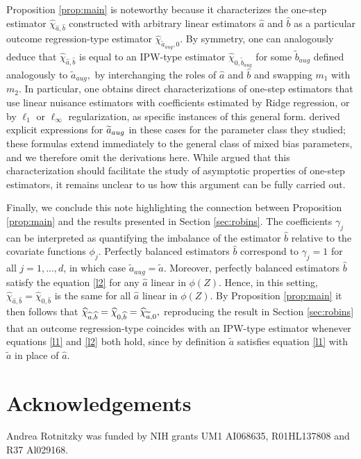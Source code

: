 \documentclass{article}
\begin{document}
Proposition \ref{prop:main} is noteworthy because it characterizes the one-step
estimator $\widehat{\chi }_{\widehat{a},\widehat{b}}$ constructed with
arbitrary linear estimators $\widehat{a}$ and $\widehat{b}$ as a particular
outcome regression-type estimator $\widehat{\chi }_{\widetilde{a}_{aug},0}$.
By symmetry, one can analogously deduce that $\widehat{\chi }_{\widehat{a},%
\widehat{b}}$ is equal to an IPW-type estimator $\widehat{\chi }_{0,%
\widetilde{b}_{aug}}$ for some $\widetilde{b}_{aug}$ defined analogously to $%
\widetilde{a}_{aug},$ by interchanging the roles of $\widehat{a}$ and $%
\widehat{b}$ and swapping $m_{1}$ with $m_{2}.$ In particular, one obtains
direct characterizations of one-step estimators that use linear nuisance
estimators  with coefficients estimated by Ridge regression, or by $\ell _{1}
$ or $\ell _{\infty }$ regularization, as specific instances of this general
form. \cite{bruns2025augmented} derived explicit expressions for $\widetilde{%
a}_{aug}$ in these cases for the parameter class they studied; these
formulas extend immediately to the general class of mixed bias parameters,
and we therefore omit the derivations here. While \cite{bruns2025augmented}
argued that this characterization should facilitate the study of asymptotic
properties of one-step estimators, it remains unclear to us how this
argument can be fully carried out.  

Finally, we conclude this note highlighting the connection between
Proposition \ref{prop:main} and the results presented in Section \ref{sec:robins}. The coefficients 
$\gamma _{j}$ can be interpreted as quantifying the imbalance of the
estimator $\widehat{b}$ relative to the covariate functions $\phi _{j}.$
Perfectly balanced estimators $\widehat{b}$ correspond to $\gamma _{j}=1$
for all $j=1,...,d$, in which case $\widetilde{a}_{aug}=\widetilde{a}.$
Moreover, perfectly balanced estimators $\widehat{b}$ satisfy the equation %
\eqref{l2} for any $\widehat{a}$ linear in $\phi \left( Z\right) $. Hence,
in this setting, $\widehat{\chi }_{\widehat{a},\widehat{b}}=\widehat{\chi }%
_{0,\widehat{b}}$ is the same for all $\widehat{a}$ linear in $\phi \left(
Z\right) .$ By Proposition \ref{prop:main} it then follows that $\widehat{\chi }_{%
\widehat{a},\widehat{b}}=\widehat{\chi }_{0,\widehat{b}}=\widehat{\chi }_{%
\widetilde{a},0},$ reproducing the result in Section \ref{sec:robins} that an outcome
regression-type coincides with an IPW-type estimator whenever equations %
\eqref{l1} and \eqref{l2} both hold, since by definition $\widetilde{a}$
satisfies equation \eqref{l1} with $\widetilde{a}$ in place of $\widehat{a}.$

\section{Acknowledgements}
Andrea Rotnitzky was funded by NIH grants UM1 AI068635, R01HL137808 and R37
Al029168.



\end{document}

